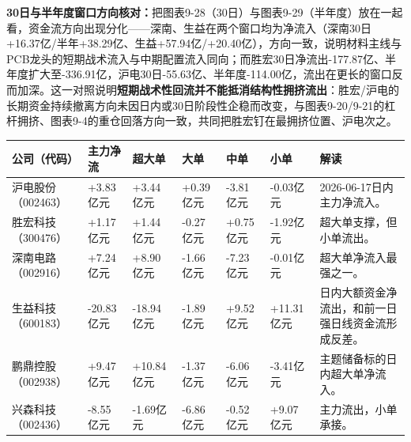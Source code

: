 \textbf{30日与半年度窗口方向核对：}把图表9-28（30日）与图表9-29（半年度）放在一起看，资金流方向出现分化——深南、生益在两个窗口均为净流入（深南30日+16.37亿/半年+38.29亿、生益+57.94亿/+20.40亿），方向一致，说明材料主线与PCB龙头的短期战术流入与中期配置流入同向；而胜宏30日净流出-177.87亿、半年度扩大至-336.91亿，沪电30日-55.63亿、半年度-114.00亿，流出在更长的窗口反而加深。这一对照说明\textbf{短期战术性回流并不能抵消结构性拥挤流出}：胜宏/沪电的长期资金持续撤离方向未因日内或30日阶段性企稳而改变，与图表9-20/9-21的杠杆拥挤、图表9-4的重仓回落方向一致，共同把胜宏钉在最拥挤位置、沪电次之。

\begin{exhibitbox}
\footnotesize
\begin{tabularx}{\textwidth}{L{1.8cm}R{1.5cm}R{1.5cm}R{1.5cm}R{1.5cm}R{1.5cm}X}
\toprule
\textbf{公司（代码）} & \textbf{主力净流} & \textbf{超大单} & \textbf{大单} & \textbf{中单} & \textbf{小单} & \textbf{解读} \\
\midrule
沪电股份（002463） & +3.83亿元 & +3.44亿元 & +0.39亿元 & -3.81亿元 & -0.03亿元 & 2026-06-17日内主力净流入。 \\
胜宏科技（300476） & +1.17亿元 & +1.44亿元 & -0.27亿元 & +0.75亿元 & -1.92亿元 & 超大单支撑，但小单流出。 \\
深南电路（002916） & +7.24亿元 & +8.90亿元 & -1.66亿元 & -7.23亿元 & -0.01亿元 & 超大单净流入最强之一。 \\
生益科技（600183） & -20.83亿元 & -18.94亿元 & -1.89亿元 & +9.52亿元 & +11.31亿元 & 日内大额资金净流出，和前一日强日线资金流形成反差。 \\
鹏鼎控股（002938） & +9.47亿元 & +10.84亿元 & -1.37亿元 & -6.06亿元 & -3.41亿元 & 主题储备标的日内超大单净流入。 \\
兴森科技（002436） & -8.55亿元 & -1.69亿元 & -6.86亿元 & -0.52亿元 & +9.07亿元 & 主力流出，小单承接。 \\
\bottomrule
\end{tabularx}
\end{exhibitbox}

